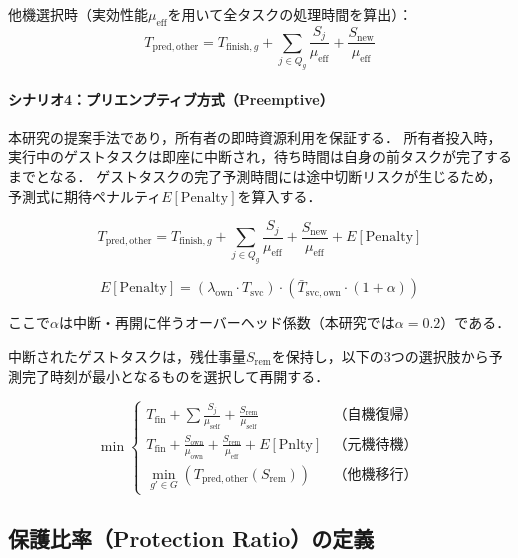 \documentclass[12pt,a4paper]{jsarticle}
\begin{document}
他機選択時（実効性能$\mu_\mathrm{eff}$を用いて全タスクの処理時間を算出）：
\begin{equation}
  T_{\mathrm{pred,other}} = T_{\mathrm{finish},g} + \sum_{j \in Q_g} \frac{S_j}{\mu_\mathrm{eff}} + \frac{S_\mathrm{new}}{\mu_\mathrm{eff}}
  \label{eq:other_select}
\end{equation}

\paragraph{シナリオ4：プリエンプティブ方式（Preemptive）}
本研究の提案手法であり，所有者の即時資源利用を保証する．
所有者投入時，実行中のゲストタスクは即座に中断され，待ち時間は自身の前タスクが完了するまでとなる．
ゲストタスクの完了予測時間には途中切断リスクが生じるため，予測式に期待ペナルティ$E[\mathrm{Penalty}]$を算入する．

\begin{equation}
  T_{\mathrm{pred,other}} = T_{\mathrm{finish},g} + \sum_{j \in Q_g} \frac{S_j}{\mu_\mathrm{eff}} + \frac{S_\mathrm{new}}{\mu_\mathrm{eff}} + E[\mathrm{Penalty}]
  \label{eq:preemptive_pred}
\end{equation}

\begin{equation}
  E[\mathrm{Penalty}] = (\lambda_\mathrm{own} \cdot T_\mathrm{svc}) \cdot (\bar{T}_{\mathrm{svc,own}} \cdot (1 + \alpha))
  \label{eq:penalty}
\end{equation}

ここで$\alpha$は中断・再開に伴うオーバーヘッド係数（本研究では$\alpha = 0.2$）である．

中断されたゲストタスクは，残仕事量$S_\mathrm{rem}$を保持し，以下の3つの選択肢から予測完了時刻が最小となるものを選択して再開する．

\begin{equation}
  \min \begin{cases}
    T_\mathrm{fin} + \sum \frac{S_j}{\mu_\mathrm{self}} + \frac{S_\mathrm{rem}}{\mu_\mathrm{self}} & \text{（自機復帰）} \\
    T_\mathrm{fin} + \frac{S_\mathrm{own}}{\mu_\mathrm{own}} + \frac{S_\mathrm{rem}}{\mu_\mathrm{eff}} + E[\mathrm{Pnlty}] & \text{（元機待機）} \\
    \min_{g' \in G} \left( T_{\mathrm{pred,other}}(S_\mathrm{rem}) \right) & \text{（他機移行）}
  \end{cases}
  \label{eq:resume}
\end{equation}

\subsection{保護比率（Protection Ratio）の定義}
\end{document}
